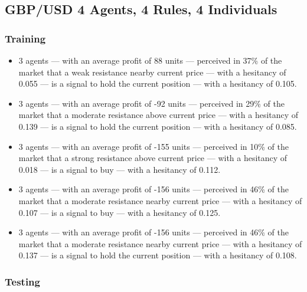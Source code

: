 \subsection{GBP/USD 4 Agents, 4 Rules, 4 Individuals}
\label{}

\subsubsection{Training}
\label{}

{\scriptsize
  \begin{itemize}
    \item 3 agents — with an average profit of 88 units — perceived in 37\% of
      the market that a weak resistance nearby current price — with a hesitancy
      of 0.055 — is a signal to hold the current position — with a hesitancy of
      0.105.
\item 3 agents — with an average profit of -92 units — perceived in 29\% of the
  market that a moderate resistance above current price — with a hesitancy of
  0.139 — is a signal to hold the current position — with a hesitancy of 0.085.
\item 3 agents — with an average profit of -155 units — perceived in 10\% of the
  market that a strong resistance above current price — with a hesitancy of
  0.018 — is a signal to buy — with a hesitancy of 0.112.
\item 3 agents — with an average profit of -156 units — perceived in 46\% of the
  market that a moderate resistance nearby current price — with a hesitancy of
  0.107 — is a signal to buy — with a hesitancy of 0.125.
\item 3 agents — with an average profit of -156 units — perceived in 46\% of the
  market that a moderate resistance nearby current price — with a hesitancy of
  0.137 — is a signal to hold the current position — with a hesitancy of 0.108.
  \end{itemize}
}

\subsubsection{Testing}
\label{}

